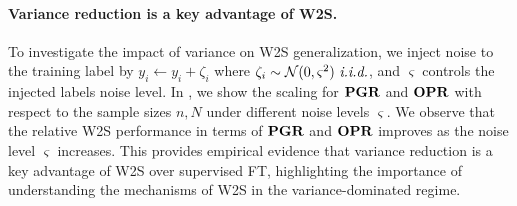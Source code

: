 \paragraph{Variance reduction is a key advantage of W2S.}
To investigate the impact of variance on W2S generalization, we inject noise to the training label by $y_i \gets y_i + \zeta_i$ where $\zeta_i \sim \mathcal{N}(0, \varsigma^2)~\emph{i.i.d.}$, and $\varsigma$ controls the injected labels noise level.
In , we show the scaling for $\mathbf{PGR}$ and $\mathbf{OPR}$ with respect to the sample sizes $n, N$ under different noise levels $\varsigma$. We observe that the relative W2S performance in terms of $\mathbf{PGR}$ and $\mathbf{OPR}$ improves as the noise level $\varsigma$ increases. This provides empirical evidence that variance reduction is a key advantage of W2S over supervised FT, highlighting the importance of understanding the mechanisms of W2S in the variance-dominated regime.

